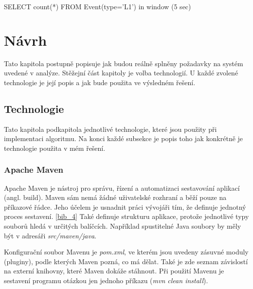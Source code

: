 \documentclass[
  digital, %
  table,   %
  nolof,     %
  nolot,     %
  oneside, %
  nocover,
  monochrome,
  12pt
]{fithesis3}
\begin{document}
\begin{center}
\begin{minipage}[H]{\linewidth}
	\begin{mylisting}
SELECT count(*) FROM Event(type='L1') in window (5 sec)
	\end{mylisting}
	\label{fig:sec_usecase_rule} 
\end{minipage}
\end{center}

\chapter{Návrh}
Tato kapitola postupně popisuje jak budou reálně splněny požadavky na systém uvedené v analýze. Stěžejní část kapitoly je volba technologií. U každé zvolené technologie je její popis a jak bude použita ve výsledném řešení.

\section{Technologie}
Tato kapitola podkapitola jednotlivé technologie, které jsou použity při implementaci algoritmu. Na konci každé subsekce je popis toho jak konkrétně je technologie použita v mém řešení.

\subsection{Apache Maven}
Apache Maven je nástroj pro správu, řízení a automatizaci sestavování aplikací (angl. build). Maven sám nemá žádné uživatelské rozhraní a běží pouze na příkazové řádce. Jeho účelem je usnadnit práci vývojáři tím, že definuje jednotný proces sestavení. \ref{bib_4} Také definuje strukturu aplikace, protože jednotlivé typy souborů hledá v určitých balíčcích. Například spustitelné Java soubory by měly být v adresáři \textit{src/maven/java}.

Konfigurační soubor Mavenu je \textit{pom.xml}, ve kterém jsou uvedeny zásuvné moduly (pluginy), podle kterých Maven pozná, co má dělat. Také je zde seznam závislostí na externí knihovny, které Maven dokáže stáhnout. Při použití Mavenu je sestavení programu otázkou jen jednoho příkazu (\textit{mvn clean install}).
\end{document}
